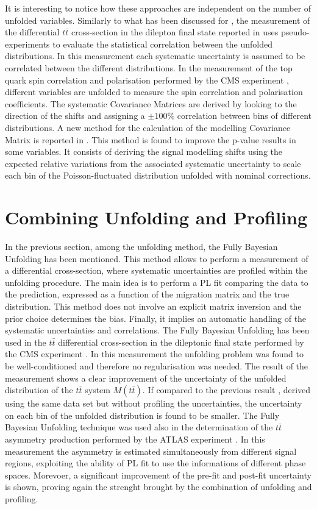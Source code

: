 \documentclass[12pt]{article}
\begin{document}
It is interesting to notice how these approaches are independent on the number of unfolded variables.
Similarly to what has been discussed for \cite{atlas_diffrential}, the measurement of the differential $t\bar{t}$ cross-section in the dilepton final state reported in \cite{atlas_diff_dilep} uses pseudo-experiments to evaluate the statistical correlation between the unfolded distributions. In this measurement each systematic uncertainty is assumed to be correlated between the different distributions. 
In the measurement of the top quark spin correlation and polarisation performed by the CMS experiment \cite{PhysRevD.100.072002}, different variables are unfolded to measure the spin correlation and polarisation coefficients. The systematic Covariance Matrices are derived by looking to the direction of the shifts and assigning a $\pm100\%$ correlation between bins of different distributions.
A new method for the calculation of the modelling Covariance Matrix is reported in \cite{allhad_atlas}. This method is found to improve the p-value results in some variables. It consists of deriving the signal modelling shifts using the expected relative variations from the associated systematic uncertainty to scale each bin of the Poisson-fluctuated distribution unfolded with nominal corrections.

\section{Combining Unfolding and Profiling}
In the previous section, among the unfolding method, the Fully Bayesian Unfolding \cite{choudalakis2012fully} has been mentioned. This method allows to perform a measurement of a differential cross-section, where systematic uncertainties are profiled within the unfolding procedure. 
The main idea is to perform a PL fit comparing the data to the prediction, expressed as a function of the migration matrix and the true distribution. This method does not involve an explicit matrix inversion and the prior choice determines the bias. Finally, it implies an automatic handling of the systematic uncertainties and correlations.
The Fully Bayesian Unfolding has been used in the $t\bar{t}$ differential cross-section in the dileptonic final state performed by the CMS experiment \cite{2020135263}. In this measurement the unfolding problem was found to be well-conditioned and therefore no regularisation was needed. 
The result of the measurement shows a clear improvement of the uncertainty of the unfolded distribution of the $t\bar{t}$ system $M(t\bar{t})$. If compared to the previous result \cite{CMS_diff_to_compare}, derived using the same data set but without profiling the uncertainties, the uncertainty on each bin of the unfolded distribution is found to be smaller.
The Fully Bayesian Unfolding technique was used also in the determination of the $t\bar{t}$ asymmetry production performed by the ATLAS experiment \cite{ATLAS-CONF-2019-026}. In this measurement the asymmetry is estimated simultaneously from different signal regions, exploiting the ability of PL fit to use the informations of different phase spaces. Morevoer, a significant improvement of the pre-fit and post-fit uncertainty is shown, proving again the strenght brought by the combination of unfolding and profiling. 
\end{document}
